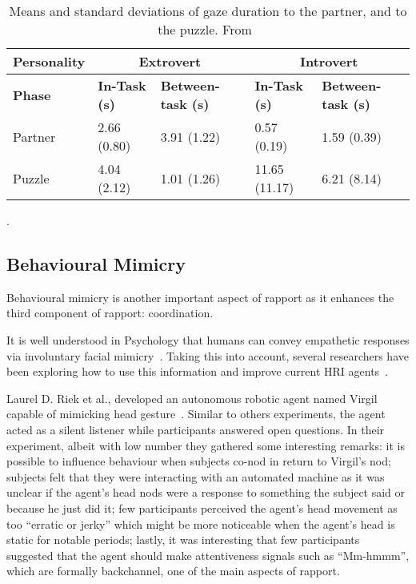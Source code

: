 \begin{table}[H]
	\centering
	\begin{tabular}{|l|l|l|l|l|}
	\hline
	\multicolumn{1}{|c|}{\textbf{Personality}} & \multicolumn{2}{c|}{\textbf{Extrovert}}  & \multicolumn{2}{c|}{\textbf{Introvert}}  \\ \hline
	\textbf{Phase}                             & \textbf{In-Task (s)} & \textbf{Between-task (s)} & \textbf{In-Task (s)} & \textbf{Between-task (s)} \\ \hline
	Partner                                    & 2.66 (0.80)      & 3.91 (1.22)           & 0.57 (0.19)      & 1.59 (0.39)           \\ \hline
	Puzzle                                     & 4.04 (2.12)      & 1.01 (1.26)           & 11.65 (11.17)    & 6.21 (8.14)           \\ \hline
	\end{tabular}
	
	\caption{Means and standard deviations of gaze duration to the partner, and to the puzzle. From~\cite{Andrist2015}}.
	\label{table:gazetimes}
\end{table}


\subsection{Behavioural Mimicry}

Behavioural mimicry is another important aspect of rapport as it enhances the third component of rapport: coordination.

It is well understood in Psychology that humans can convey empathetic responses via involuntary facial mimicry~\cite{Riek2009, Mancini2013, Chartrand1999}. Taking this into account, several researchers have been exploring how to use this information and improve current \ac{HRI} agents~\cite{Chartrand1999, Sidner2006, Hatfield1992}.

Laurel D. Riek et al., developed an autonomous robotic agent named Virgil capable of mimicking head gesture~\cite{Riek2009}. Similar to others experiments, the agent acted as a silent listener while participants answered open questions. In their experiment, albeit with low number they gathered some interesting remarks: it is possible to influence behaviour when subjects co-nod in return to Virgil's nod; subjects felt that they were interacting with an automated machine as it was unclear if the agent's head nods were a response to something the subject said or because he just did it; few participants perceived the agent's head movement as too ``erratic or jerky'' which might be more noticeable when the agent's head is static for notable periods; lastly, it was interesting that few participants suggested that the agent should make attentiveness signals such as ``Mm-hmmm'', which are formally backchannel, one of the main aspects of rapport.

